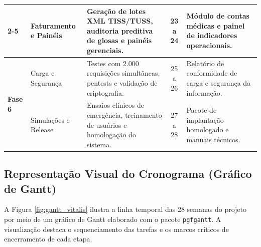 \begin{table}[H]
\begin{tabularx}{\textwidth}{l >{\raggedright\arraybackslash}p{2.8cm} >{\raggedright\arraybackslash}X c >{\raggedright\arraybackslash}p{3.5cm}}
\cmidrule(lr){2-5}
 & Faturamento e Painéis & Geração de lotes XML TISS/TUSS, auditoria preditiva de glosas e painéis gerenciais. & 23 a 24 & Módulo de contas médicas e painel de indicadores operacionais. \\
\midrule
\multirow{2}{*}{\textbf{Fase 6}} & Carga e Segurança & Testes com 2.000 requisições simultâneas, pentests e validação de criptografia. & 25 a 26 & Relatório de conformidade de carga e segurança da informação. \\
\cmidrule(lr){2-5}
 & Simulações e Release & Ensaios clínicos de emergência, treinamento de usuários e homologação do sistema. & 27 a 28 & Pacote de implantação homologado e manuais técnicos. \\
\bottomrule
\end{tabularx}
\end{table}

\subsection{Representação Visual do Cronograma (Gráfico de Gantt)}

A Figura \ref{fig:gantt_vitalis} ilustra a linha temporal das 28 semanas do projeto por meio de um gráfico de Gantt elaborado com o pacote \texttt{pgfgantt}. A visualização destaca o sequenciamento das tarefas e os marcos críticos de encerramento de cada etapa.

